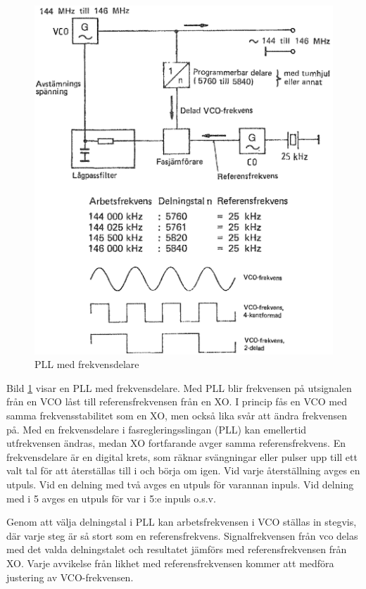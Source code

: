\begin{figure}
\includegraphics[width=\textwidth]{images/cropped_pdfs/bild_2_3-82.pdf}
\caption{PLL med frekvensdelare}
\label{fig:BildII3-82}
\end{figure}

Bild \ref{fig:BildII3-82} visar en PLL med frekvensdelare.
Med PLL blir frekvensen på utsignalen från en VCO låst till referensfrekvensen
från en XO.
I princip fås en VCO med samma frekvensstabilitet som en XO, men också lika
svår att ändra frekvensen på.
Med en frekvensdelare i fasregleringsslingan (PLL) kan emellertid utfrekvensen
ändras, medan XO fortfarande avger samma referensfrekvens.
En frekvensdelare är en digital krets, som räknar svängningar eller pulser upp
till ett valt tal för att återställas till i och börja om igen.
Vid varje återställning avges en utpuls.
Vid en delning med två avges en utpuls för varannan inpuls.
Vid delning med i 5 avges en utpuls för var i 5:e inpuls o.s.v.

Genom att välja delningstal i PLL kan arbetsfrekvensen i VCO ställas
in stegvis, där varje steg är så stort som en referensfrekvens.
Signalfrekvensen från vco delas med det valda delningstalet och resultatet
jämförs med referensfrekvensen från XO.
Varje avvikelse från likhet med referensfrekvensen kommer att
medföra justering av VCO-frekvensen.

